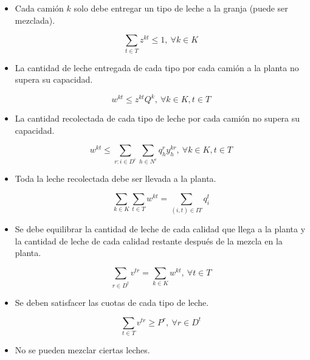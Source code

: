 \documentclass[letter, 10pt]{article}
\begin{document}
\begin{itemize}
     \item Cada cami\'on $k$ solo debe entregar un tipo de leche a la granja (puede ser mezclada).
     
     \begin{equation}
         \sum_{t \in T} z^{kt} \leq 1, \: \forall k \in K
     \end{equation}
     
     \item La cantidad de leche entregada de cada tipo por cada cami\'on a la planta no supera su capacidad.
     
     \begin{equation}
         w^{kt} \leq z^{kt}Q^k, \: \forall k \in K, t \in T
     \end{equation}
     
     \item La cantidad recolectada de cada tipo de leche por cada cami\'on no supera su capacidad.
     
     \begin{equation}
         w^{kt} \leq \sum_{r:i \in D^r} \sum_{h \in N^r} q^r_h y^{kr}_h, \: \forall k \in K, t \in T
     \end{equation}
     
     \item Toda la leche recolectada debe ser llevada a la planta.
     
     \begin{equation}
         \sum_{k \in K} \sum_{t \in T} w^{kt} = \sum_{(i,t) \in IT} q^t_i
     \end{equation}
     
     \item Se debe equilibrar la cantidad de leche de cada calidad que llega a la planta y la cantidad de leche de cada calidad restante despu\'es de la mezcla en la planta.
     
     \begin{equation}
         \sum_{r \in D^t} v^{tr} = \sum_{k \in K} w^{kt}, \: \forall t \in T
     \end{equation}
     
     \item Se deben satisfacer las cuotas de cada tipo de leche.
     
     \begin{equation}
         \sum_{t \in T} v^{tr} \geq P^r, \: \forall r \in D^t
     \end{equation}
     
     \item No se pueden mezclar ciertas leches.
     

\end{itemize}
\end{document}

